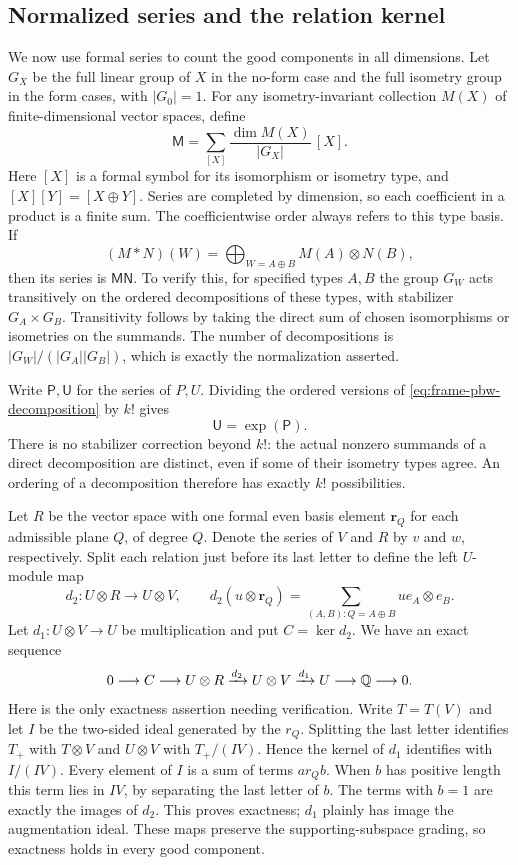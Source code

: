 \subsection{Normalized series and the relation kernel}

We now use formal series to count the good components in all dimensions.
Let $G_X$ be the full linear group of $X$ in the no-form case and the
full isometry group in the form cases, with $|G_0|=1$.  For any
isometry-invariant collection $M(X)$ of finite-dimensional vector
spaces, define
\[
 \mathsf M=\sum_{[X]}\frac{\dim M(X)}{|G_X|}\,[X].
\]
Here $[X]$ is a formal symbol for its isomorphism or isometry type,
and $[X][Y]=[X\oplus Y]$.  Series are completed by dimension, so each
coefficient in a product is a finite sum.  The coefficientwise order
always refers to this type basis.  If
\[
 (M*N)(W)=\bigoplus_{W=A\oplus B}M(A)\otimes N(B),
\]
then its series is $\mathsf M\mathsf N$.  To verify this, for specified
types $A,B$ the group $G_W$ acts transitively on the ordered
decompositions of these types, with stabilizer $G_A\times G_B$.
Transitivity follows by taking the direct sum of chosen isomorphisms
or isometries on the summands.  The number of decompositions is
$|G_W|/(|G_A||G_B|)$, which is exactly the normalization asserted.

Write $\mathsf P,\mathsf U$ for the series of $P,U$.  Dividing the
ordered versions of \eqref{eq:frame-pbw-decomposition} by $k!$ gives
\begin{equation}\label{eq:frame-exponential}
 \mathsf U=\exp(\mathsf P).
\end{equation}
There is no stabilizer correction beyond $k!$: the actual nonzero
summands of a direct decomposition are distinct, even if some of their
isometry types agree.  An ordering of a decomposition therefore has
exactly $k!$ possibilities.

Let $R$ be the vector space with one formal even basis element $\mathbf r_Q$
for each admissible plane $Q$, of degree $Q$.  Denote the series of
$V$ and $R$ by $v$ and $w$, respectively.  Split each relation just
before its last letter to define the left $U$-module map
\[
 d_2:U\otimes R\longrightarrow U\otimes V,
 \qquad
 d_2(u\otimes\mathbf r_Q)
   =\sum_{(A,B):Q=A\oplus B}u e_A\otimes e_B.
\]
Let $d_1:U\otimes V\to U$ be multiplication and put $C=\ker d_2$.
We have an exact sequence
\begin{equation}\label{eq:frame-relation-complex}
 0\longrightarrow C\longrightarrow U\otimes R
 \xrightarrow{d_2}U\otimes V\xrightarrow{d_1}U
 \longrightarrow\mathbb Q\longrightarrow0.
\end{equation}
Here is the only exactness assertion needing verification.  Write
$T=T(V)$ and let $I$ be the two-sided ideal generated by the $r_Q$.
Splitting the last letter identifies $T_+$ with $T\otimes V$ and
$U\otimes V$ with $T_+/(IV)$.  Hence the kernel of $d_1$ identifies
with $I/(IV)$.  Every element of $I$ is a sum of terms $a r_Q b$.
When $b$ has positive length this term lies in $IV$, by separating
the last letter of $b$.  The terms with $b=1$ are exactly the images
of $d_2$.  This proves exactness; $d_1$ plainly has image the
augmentation ideal.  These maps preserve the supporting-subspace
grading, so exactness holds in every good component.

